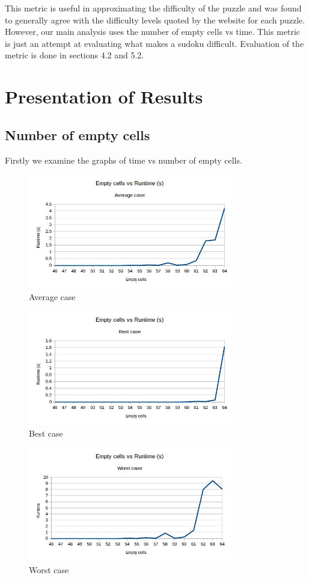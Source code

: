 \documentclass{article}
\begin{document}
This metric is useful in approximating the difficulty of the puzzle and was found to generally agree with the difficulty levels quoted by the website for each puzzle. However, our main analysis uses the number of empty cells vs time. This metric is just an attempt at evaluating what makes a sudoku difficult. Evaluation of the metric is done in sections 4.2 and 5.2.

\newpage

\section{Presentation of Results}
\subsection{Number of empty cells}
Firstly we examine the graphs of time vs number of empty cells.

\begin{figure}[H]
	\includegraphics[width=0.9\linewidth, height=5cm]{graphs_outputs/EmptycellsVSTimeAverage.jpg}
	\caption{Average case}
\end{figure}

\begin{figure}[H]
	\includegraphics[width=0.9\linewidth, height=5cm]{graphs_outputs/EmptycellsVSTimeBest.jpg}
	\caption{Best case}
\end{figure}

\begin{figure}[H]
	\includegraphics[width=0.9\linewidth, height=5cm]{graphs_outputs/EmptycellsVSTimeWorst.jpg}
	\caption{Worst case}
\end{figure}
\end{document}
